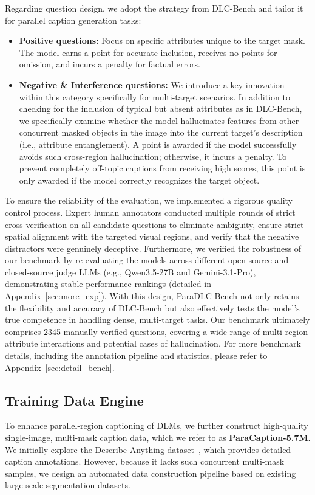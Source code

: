 Regarding question design, we adopt the strategy from DLC-Bench and tailor it for parallel caption generation tasks:
\begin{itemize}
    \item \textbf{Positive questions:} Focus on specific attributes unique to the target mask. The model earns a point for accurate inclusion, receives no points for omission, and incurs a penalty for factual errors.
    \item \textbf{Negative \& Interference questions:} We introduce a key innovation within this category specifically for multi-target scenarios. In addition to checking for the inclusion of typical but absent attributes as in DLC-Bench, we specifically examine whether the model hallucinates features from other concurrent masked objects in the image into the current target's description (i.e., attribute entanglement). A point is awarded if the model successfully avoids such cross-region hallucination; otherwise, it incurs a penalty. To prevent completely off-topic captions from receiving high scores, this point is only awarded if the model correctly recognizes the target object.
\end{itemize}

To ensure the reliability of the evaluation, we implemented a rigorous quality control process. Expert human annotators conducted multiple rounds of strict cross-verification on all candidate questions to eliminate ambiguity, ensure strict spatial alignment with the targeted visual regions, and verify that the negative distractors were genuinely deceptive. Furthermore, we verified the robustness of our benchmark by re-evaluating the models across different open-source and closed-source judge LLMs (e.g., Qwen3.5-27B and Gemini-3.1-Pro), demonstrating stable performance rankings (detailed in Appendix~\ref{sec:more_exp}).
%
With this design, ParaDLC-Bench not only retains the flexibility and accuracy of DLC-Bench but also effectively tests the model's true competence in handling dense, multi-target tasks. 
%
Our benchmark ultimately comprises 2345 manually verified questions, covering a wide range of multi-region attribute interactions and potential cases of hallucination.
%
For more benchmark details, including the annotation pipeline and statistics, please refer to Appendix~\ref{sec:detail_bench}.

\vspace{-2mm}
\subsection{Training Data Engine}
To enhance parallel-region captioning of DLMs, we further construct high-quality single-image, multi-mask caption data, which we refer to as \textbf{ParaCaption-5.7M}.
%
We initially explore the Describe Anything dataset~\citep{lian2025describe}, which provides detailed caption annotations. 
%
However, because it lacks such concurrent multi-mask samples, we design an automated data construction pipeline based on existing large-scale segmentation datasets.

